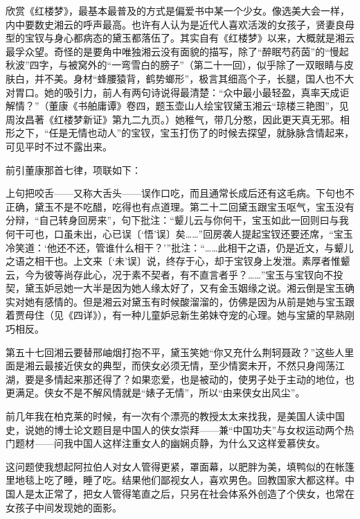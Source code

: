 \par 欣赏《红楼梦》，最基本最普及的方式是偏爱书中某一个少女。像选美大会一样，内中要数史湘云的呼声最高。也许有人认为是近代人喜欢活泼的女孩子，贤妻良母型的宝钗与身心都病态的黛玉都落伍了。其实自有《红楼梦》以来，大概就是湘云最孚众望。奇怪的是要角中唯独湘云没有面貌的描写，除了“醉眠芍药茵”的“慢起秋波”四字，与被窝外的“一弯雪白的膀子”（第二十一回），似乎除了一双眼睛与皮肤白，并不美。身材“蜂腰猿背，鹤势螂形”，极言其细高个子，长腿，国人也不大对胃口。她的吸引力，前人有两句诗说得最清楚：“众中最小最轻盈，真率天成讵解情？”（董康《书舶庸谭》卷四，题玉壶山人绘宝钗黛玉湘云“琼楼三艳图”，见周汝昌著《红楼梦新证》第九二九页。）她稚气，带几分憨，因此更天真无邪。相形之下，“任是无情也动人”的宝钗，宝玉打伤了的时候去探望，就脉脉含情起来，可见平时不过不露出来。
\par 前引董康那首七律，项联如下：
\par 上句把咬舌——又称大舌头——误作口吃，而且通常长成后还有这毛病。下句也不正确，黛玉不是不吃醋，吃得也有点道理。第二十二回黛玉跟宝玉呕气，宝玉没有分辩，“自己转身回房来”，句下批注：“颦儿云与你何干，宝玉如此一回则曰与我何干可也，口虽未出，心已误〔‘悟’误〕矣……”回房袭人提起宝钗还要还席，“宝玉冷笑道：‘他还不还，管谁什么相干？'”批注：“……此相干之语，仍是近文，与颦儿之语之相干也。上文来〔‘未’误〕说，终存于心，却于宝钗身上发泄。素厚者惟颦云，今为彼等尚存此心，况于素不契者，有不直言者乎？……”宝玉与宝钗向不投契，黛玉妒忌她一大半是因为她人缘太好了，又有金玉姻缘之说。湘云倒是宝玉确实对她有感情的。但是湘云对黛玉有时候酸溜溜的，仿佛是因为从前是她与宝玉跟着贾母住（见《四详》），有一种儿童妒忌新生弟妹夺宠的心理。她与宝黛的早熟刚巧相反。
\par 第五十七回湘云要替邢岫烟打抱不平，黛玉笑她“你又充什么荆轲聂政？”这些人里面是湘云最接近侠女的典型，而侠女必须无情，至少情窦未开，不然只身闯荡江湖，要是多情起来那还得了？如果恋爱，也是被动的，使男子处于主动的地位，也更满足。侠女不是不解风情就是“婊子无情”，所以“由来侠女出风尘”。
\par 前几年我在柏克莱的时候，有一次有个漂亮的教授太太来找我，是美国人读中国史，说她的博士论文题目是中国人的侠女崇拜——兼“中国功夫”与女权运动两个热门题材——问我中国人这样注重女人的幽娴贞静，为什么又这样爱慕侠女。
\par 这问题使我想起阿拉伯人对女人管得更紧，罩面幕，以肥胖为美，填鸭似的在帐篷里地毯上吃了睡，睡了吃。结果他们鄙视女人，喜欢男色。回教国家大都这样。中国人是太正常了，把女人管得笔直之后，只另在社会体系外创造了个侠女，也常在女孩子中间发现她的面影。
